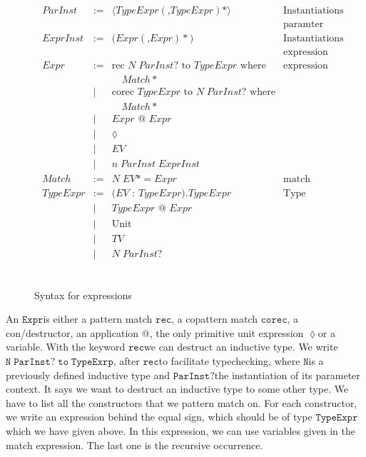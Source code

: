 \documentclass[a4paper,cleardoubleempty,BCOR1cm]{scrbook}
\begin{document}
\begin{figure}
 \begin{align*}
   \begin{array}{llll}
     ParInst &:= &\langle TypeExpr(\text{,}TypeExpr)*\rangle &\text{Instantiations for}\\
                                                            &&&\text{paramter contexts}\\
     ExprInst &:= &\text{(}Expr(\text{,}Expr)*\text{)} &\text{Instantiations for}\\
                                                       &&&\text{expression contexts}\\
     Expr &:= &\text{rec } N \; ParInst? \text{ to } TypeExpr \text{ where} &\text{expression}\\
     &&\quad Match*&\\
     &| &\text{corec } TypeExpr \text { to } N \; ParInst? \text{ where}&\\
     &&\quad Match*&\\
     &| &Expr\text{ @ }Expr &\\
     &| &\lozenge&\\
     &| &EV&\\
     &| &n\; ParInst\; ExprInst&\\
     Match &:= &N\; EV* = Expr &\text{match}\\
     TypeExpr &:= &\text{(}EV\text{ : }TypeExpr\text{).}TypeExpr &\text{Type expressions}\\
     &| &TypeExpr\text{ @ }Expr&\\
     &| &\text{Unit} &\\
     &| &TV&\\
     &| &N\; ParInst? &\\
  \end{array}
\end{align*}
\begin{lstlisting}
\end{lstlisting}
\caption{Syntax for expressions}
\label{syntax-for-expressions}
\end{figure}

An $\mathtt{Expr}$\;is either a pattern match $\mathtt{rec}$, a copattern match $\mathtt{corec}$, a
con/destructor, an application $\mathtt{@}$, the only primitive unit expression
$\mathtt{\lozenge}$\;or a variable. With the keyword $\mathtt{rec}$\;we can destruct an
inductive type. We write $\mathtt{N\;ParInst?\;to\;TypeExrp}$, after $\mathtt{rec}$\;to facilitate
typechecking, where $\mathtt{N}$\;is a previously defined inductive type and
$\mathtt{ParInst?}$\;the instantiation of its parameter context. It says we want to
destruct an inductive type to some other type. We have to list all the
constructors that we pattern match on. For each constructor, we write an
expression behind the equal sign, which should be of type $\mathtt{TypeExpr}$\;which
we have given above. In this expression, we can use variables given in the
match expression. The last one is the recursive occurrence.
\end{document}
